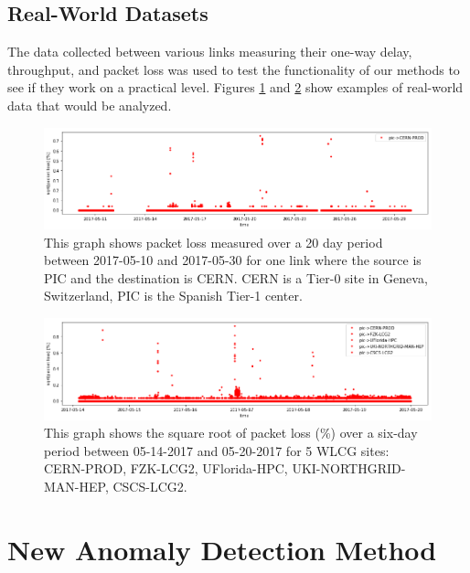\documentclass[5p]{elsarticle}
\begin{document}
\fi


\subsection{Real-World Datasets}

The data collected between various links measuring their one-way delay, throughput, and packet loss was used to test the functionality of our methods to see if they work on a practical level. Figures \ref{fig:real_one} and \ref{fig:real_five} show examples of real-world data that would be analyzed.

\begin{figure}[htbp]
    \centering
    \includegraphics[width=\linewidth]{real_data_one_link.png}
    \caption{This graph shows packet loss measured over a 20 day period between 2017-05-10 and 2017-05-30 for one link where the source is PIC and the destination is CERN. CERN is a Tier-0 site in Geneva, Switzerland, PIC is the Spanish Tier-1 center.}
    \label{fig:real_one}
\end{figure}

\begin{figure}[htbp]
    \centering
    \includegraphics[width=\linewidth]{real_data_5_links.png}
    \caption{This graph shows the square root of packet loss (\%)  over a six-day period between 05-14-2017 and 05-20-2017 for 5 WLCG sites: CERN-PROD, FZK-LCG2, UFlorida-HPC, UKI-NORTHGRID-MAN-HEP, CSCS-LCG2.}
    \label{fig:real_five}
\end{figure}

\section{New Anomaly Detection Method}
\end{document}
